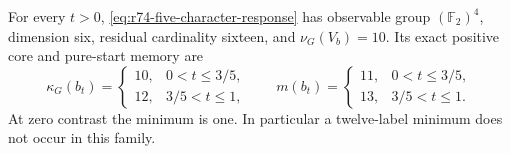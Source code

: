 \begin{proposition}
\label{prop:r74-circuit-transition}
For every $t>0$, \eqref{eq:r74-five-character-response} has observable
group $(\mathbb F_2)^4$, dimension six, residual cardinality sixteen, and
$\nu_G(V_b)=10$. Its exact positive core and pure-start memory are
\[
 \kappa_G(b_t)=
 \begin{cases}10,&0<t\le3/5,\\12,&3/5<t\le1,\end{cases}
 \qquad
 m(b_t)=
 \begin{cases}11,&0<t\le3/5,\\13,&3/5<t\le1.\end{cases}
\]
At zero contrast the minimum is one. In particular a twelve-label minimum
does not occur in this family.
\end{proposition}
